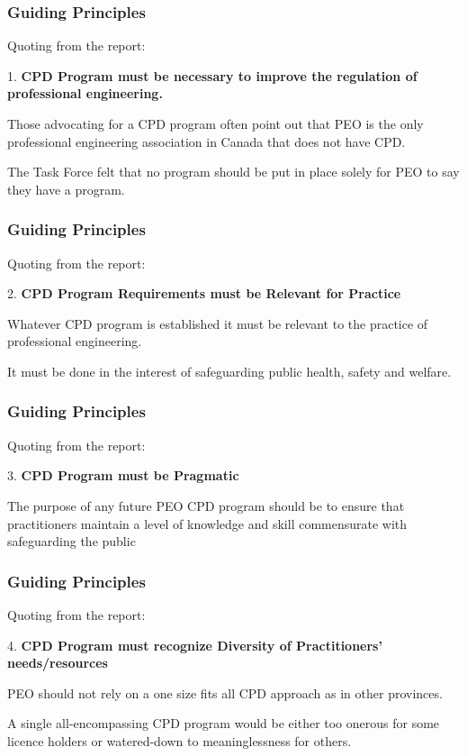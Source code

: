 \begin{frame}
\frametitle{Guiding Principles}

Quoting from the report:

1. \textbf{CPD Program must be necessary to improve the regulation of professional engineering.}

Those advocating for a CPD program often point out that PEO is the only professional engineering association in Canada that does not have CPD. 

The Task Force felt that no program should be put in place solely for PEO to say they have a program.

\end{frame}



\begin{frame}
\frametitle{Guiding Principles}

Quoting from the report:

2. \textbf{CPD Program Requirements must be Relevant for Practice}


Whatever CPD program is established it must be relevant to the practice of professional engineering.

It must be done in the interest of safeguarding public health, safety and welfare. 


\end{frame}


\begin{frame}
\frametitle{Guiding Principles}

Quoting from the report:

3. \textbf{CPD Program must be Pragmatic}

The purpose of any future PEO CPD program should be to ensure that practitioners maintain a level of knowledge and skill commensurate with safeguarding the public


\end{frame}

\begin{frame}
\frametitle{Guiding Principles}

Quoting from the report:

4. \textbf{CPD Program must recognize Diversity of Practitioners' needs/resources}

PEO should not rely on a one size fits all CPD approach as in other provinces. 

A single all-encompassing CPD program would be either too onerous for some licence holders or watered-down to meaninglessness for others. 

\end{frame}



